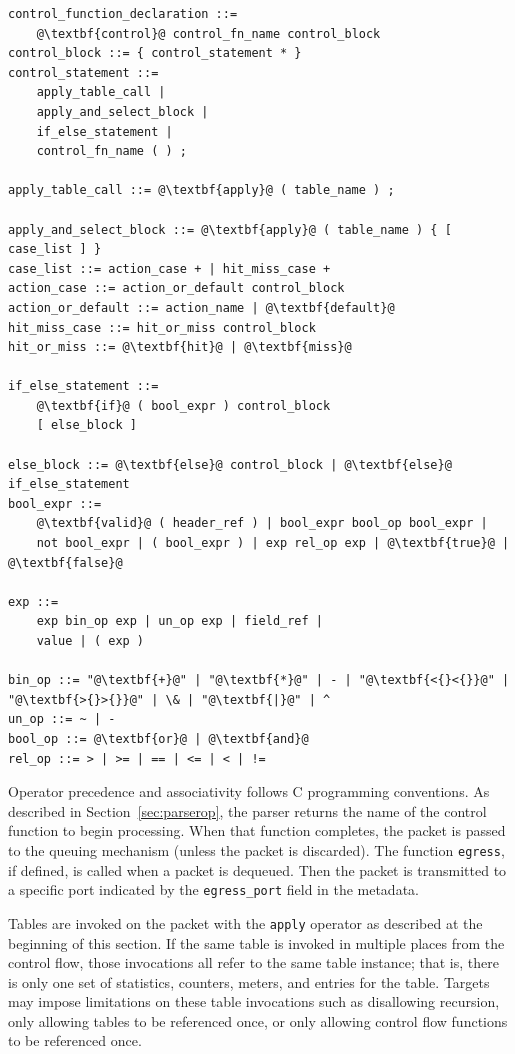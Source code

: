 \documentclass[12pt]{article}
\begin{document}
\begin{lstlisting}[frame=single,backgroundcolor=\color{bnfgreen},escapechar=\@]
control_function_declaration ::=
    @\textbf{control}@ control_fn_name control_block
control_block ::= { control_statement * }
control_statement ::= 
    apply_table_call |
    apply_and_select_block |
    if_else_statement |
    control_fn_name ( ) ;

apply_table_call ::= @\textbf{apply}@ ( table_name ) ;

apply_and_select_block ::= @\textbf{apply}@ ( table_name ) { [ case_list ] }
case_list ::= action_case + | hit_miss_case +
action_case ::= action_or_default control_block
action_or_default ::= action_name | @\textbf{default}@
hit_miss_case ::= hit_or_miss control_block
hit_or_miss ::= @\textbf{hit}@ | @\textbf{miss}@

if_else_statement ::=
    @\textbf{if}@ ( bool_expr ) control_block
    [ else_block ]

else_block ::= @\textbf{else}@ control_block | @\textbf{else}@ if_else_statement
bool_expr ::=
    @\textbf{valid}@ ( header_ref ) | bool_expr bool_op bool_expr |
    not bool_expr | ( bool_expr ) | exp rel_op exp | @\textbf{true}@ | @\textbf{false}@

exp ::=
    exp bin_op exp | un_op exp | field_ref |
    value | ( exp )

bin_op ::= "@\textbf{+}@" | "@\textbf{*}@" | - | "@\textbf{<{}<{}}@" | "@\textbf{>{}>{}}@" | \& | "@\textbf{|}@" | ^
un_op ::= ~ | -
bool_op ::= @\textbf{or}@ | @\textbf{and}@
rel_op ::= > | >= | == | <= | < | !=
\end{lstlisting}

Operator precedence and associativity follows C programming conventions.
As described in Section~\ref{sec:parserop}, the parser returns the name 
of the control function to begin \matchaction processing.  When that function 
completes, the packet is passed to the queuing mechanism (unless the packet 
is discarded).  The function \texttt{egress}, if defined, is called when a packet 
is dequeued. Then the packet is transmitted to a specific port indicated by 
the \texttt{egress_port} field in the metadata.

Tables are invoked on the packet with the \texttt{apply} operator as described at 
the beginning of this section. If the same table is invoked in multiple places 
from the control flow, those invocations all refer to the same table instance; 
that is, there is only one set of statistics, counters, meters, and \matchaction 
entries for the table. Targets may impose limitations on these table invocations 
such as disallowing recursion, only allowing tables to be referenced once, 
or only allowing control flow functions to be referenced once.
\end{document}
